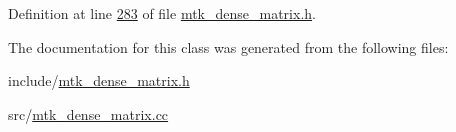 Definition at line \hyperlink{mtk__dense__matrix_8h_source_l00283}{283} of file \hyperlink{mtk__dense__matrix_8h_source}{mtk\+\_\+dense\+\_\+matrix.\+h}.



The documentation for this class was generated from the following files\+:\begin{DoxyCompactItemize}
\item 
include/\hyperlink{mtk__dense__matrix_8h}{mtk\+\_\+dense\+\_\+matrix.\+h}\item 
src/\hyperlink{mtk__dense__matrix_8cc}{mtk\+\_\+dense\+\_\+matrix.\+cc}\end{DoxyCompactItemize}
